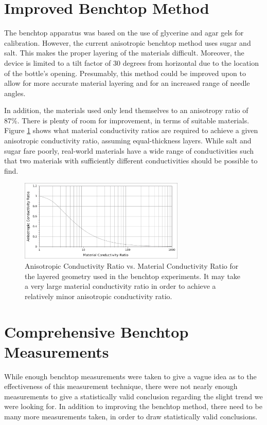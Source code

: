 \section{Improved Benchtop Method}

The benchtop apparatus was based on the use of glycerine and agar gels for
calibration. However, the current anisotropic benchtop method uses sugar and
salt. This makes the proper layering of the materials difficult. Moreover, the
device is limited to a tilt factor of \(30\) degrees from horizontal due to the
location of the bottle's opening. Presumably, this method could be improved upon
to allow for more accurate material layering and for an increased range of
needle angles.

In addition, the materials used only lend themselves to an anisotropy ratio of
87\%. There is plenty of room for improvement, in terms of suitable materials.
Figure \ref{fig:anisovmatl_rats} shows what material conductivity ratios are
required to achieve a given anisotropic conductivity ratio, assuming
equal-thickness layers. While salt and
sugar fare poorly, real-world materials have a wide range of conductivities
such that two materials with sufficiently different conductivities should be
possible to find.

\begin{figure}[h]
\centering
\includegraphics[width=0.7\textwidth]{fig/anisovmaterial_ratios.png}
\caption{Anisotropic Conductivity Ratio vs. Material Conductivity Ratio for the
layered geometry used in the benchtop experiments. It may take a very large
material conductivity ratio in order to achieve a relatively minor anisotropic
conductivity ratio.}
\label{fig:anisovmatl_rats}
\end{figure}

\section{Comprehensive Benchtop Measurements}

While enough benchtop measurements were taken to give a vague idea as to the
effectiveness of this measurement technique, there were not nearly enough
measurements to give a statistically valid conclusion regarding the slight
trend we were looking for. In addition to improving the benchtop method, there
need to be many more measurements taken, in order to draw statistically valid
conclusions.

